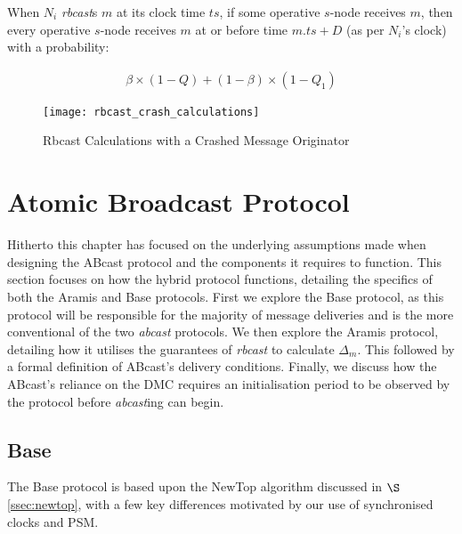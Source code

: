 When $N_i$ \emph{rbcast}s $m$ at its clock time $ts$, if some operative $s$-node receives $m$, then every operative $s$-node receives $m$ at or before time $m.ts+D$ (as per $N_i$'s clock) with a probability:

         \begin{equation}
            \begin{aligned}
                \beta\times(1-Q)+(1-\beta)\times(1-Q_1)
            \end{aligned}
        \end{equation}

        \begin{sidewaysfigure}
            \vspace*{-1cm}
            \strictpagecheck
            \checkoddpage
            \ifoddpage
                \hspace*{-2.5cm}
            \fi           
            \centering
                \texttt{[image: rbcast\_crash\_calculations]}
            \caption[Rbcast Calculation Diagram with a Crashed Message Originator]{Rbcast Calculations with a Crashed Message Originator}
            \label{fig:rbcast_crash_calc}
       \end{sidewaysfigure}
                
\clearpage
\section{Atomic Broadcast Protocol}\label{sec:ABcast}
Hitherto this chapter has focused on the underlying assumptions made when designing the \textsf{ABcast} protocol and the components it requires to function.  This section focuses on how the hybrid protocol functions, detailing the specifics of both the \textsf{Aramis} and \textsf{Base} protocols.  First we explore the \textsf{Base} protocol, as this protocol will be responsible for the majority of message deliveries and is the more conventional of the two \emph{abcast} protocols.  We then explore the \textsf{Aramis} protocol, detailing how it utilises the guarantees of \emph{rbcast} to calculate $\Delta_m$.   This followed by a formal definition of \textsf{ABcast}'s delivery conditions.  Finally, we discuss how the \textsf{ABcast}'s reliance on the DMC requires an initialisation period to be observed by the protocol before \emph{abcast}ing can begin.  

    \subsection{Base}
    The \textsf{Base} protocol is based upon the NewTop \citep{Ezhilchelvan:1995:NFG:876885.880005} algorithm discussed in $\S$ \ref{ssec:newtop}, with a few key differences motivated by our use of synchronised clocks and PSM.  
    
